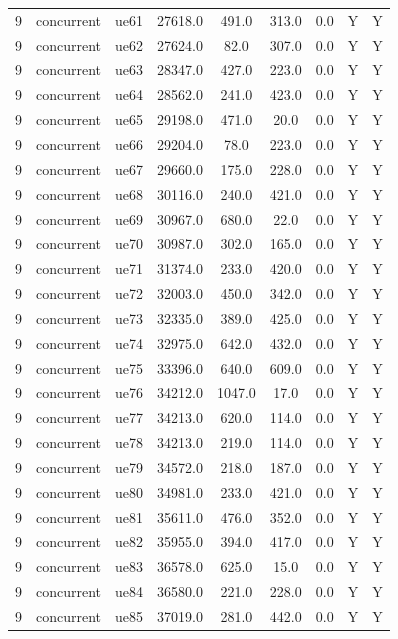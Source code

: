 \begin{table}[ht]
\begin{tabular}{|c|c|c|c|c|c|c|c|c|}
9 & concurrent & ue61 & 27618.0 & 491.0 & 313.0 & 0.0 & Y & Y \\
9 & concurrent & ue62 & 27624.0 & 82.0 & 307.0 & 0.0 & Y & Y \\
9 & concurrent & ue63 & 28347.0 & 427.0 & 223.0 & 0.0 & Y & Y \\
9 & concurrent & ue64 & 28562.0 & 241.0 & 423.0 & 0.0 & Y & Y \\
9 & concurrent & ue65 & 29198.0 & 471.0 & 20.0 & 0.0 & Y & Y \\
9 & concurrent & ue66 & 29204.0 & 78.0 & 223.0 & 0.0 & Y & Y \\
9 & concurrent & ue67 & 29660.0 & 175.0 & 228.0 & 0.0 & Y & Y \\
9 & concurrent & ue68 & 30116.0 & 240.0 & 421.0 & 0.0 & Y & Y \\
9 & concurrent & ue69 & 30967.0 & 680.0 & 22.0 & 0.0 & Y & Y \\
9 & concurrent & ue70 & 30987.0 & 302.0 & 165.0 & 0.0 & Y & Y \\
9 & concurrent & ue71 & 31374.0 & 233.0 & 420.0 & 0.0 & Y & Y \\
9 & concurrent & ue72 & 32003.0 & 450.0 & 342.0 & 0.0 & Y & Y \\
9 & concurrent & ue73 & 32335.0 & 389.0 & 425.0 & 0.0 & Y & Y \\
9 & concurrent & ue74 & 32975.0 & 642.0 & 432.0 & 0.0 & Y & Y \\
9 & concurrent & ue75 & 33396.0 & 640.0 & 609.0 & 0.0 & Y & Y \\
9 & concurrent & ue76 & 34212.0 & 1047.0 & 17.0 & 0.0 & Y & Y \\
9 & concurrent & ue77 & 34213.0 & 620.0 & 114.0 & 0.0 & Y & Y \\
9 & concurrent & ue78 & 34213.0 & 219.0 & 114.0 & 0.0 & Y & Y \\
9 & concurrent & ue79 & 34572.0 & 218.0 & 187.0 & 0.0 & Y & Y \\
9 & concurrent & ue80 & 34981.0 & 233.0 & 421.0 & 0.0 & Y & Y \\
9 & concurrent & ue81 & 35611.0 & 476.0 & 352.0 & 0.0 & Y & Y \\
9 & concurrent & ue82 & 35955.0 & 394.0 & 417.0 & 0.0 & Y & Y \\
9 & concurrent & ue83 & 36578.0 & 625.0 & 15.0 & 0.0 & Y & Y \\
9 & concurrent & ue84 & 36580.0 & 221.0 & 228.0 & 0.0 & Y & Y \\
9 & concurrent & ue85 & 37019.0 & 281.0 & 442.0 & 0.0 & Y & Y \\

\end{tabular}
\end{table}
